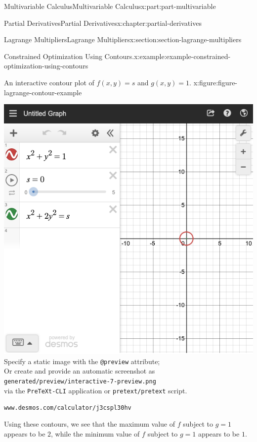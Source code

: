 \documentclass[twoside,10pt,]{book}
\newcommand{\mono}[1]{\texttt{#1}}
\numberwithin{equation}{part}
\newlength{\qrsize}
\newlength{\previewwidth}
\begin{document}
\begin{partptx}{Multivariable Calculus}{}{Multivariable Calculus}{}{}{x:part:part-multivariable}
\begin{chapterptx}{Partial Derivatives}{}{Partial Derivatives}{}{}{x:chapter:partial-derivatives}
\begin{sectionptx}{Lagrange Multipliers}{}{Lagrange Multipliers}{}{}{x:section:section-lagrange-multipliers}
\begin{example}{Constrained Optimization Using Contours.}{x:example:example-constrained-optimization-using-contours}
\begin{figureptx}{An interactive contour plot of \(f(x,y) = s\) and \(g(x,y) = 1\).%
}{x:figure:figure-lagrange-contour-example}{}
\begin{tcbraster}[raster columns=2, raster column skip=1pt, raster halign=center, raster force size=false, raster left skip=0pt, raster right skip=0pt]
\begin{tcolorbox}[previewstyle, width=\previewwidth]
{\includegraphics[width=0.80\linewidth,height=\qrsize,keepaspectratio]{generated/preview/interactive-7-preview.png}}%
{\small{}Specify a static image with the \mono{@preview} attribute;\\%
Or create and provide an automatic screenshot as\\%
\mono{generated/preview/interactive-7-preview.png}\\%
via the \mono{PreTeXt-CLI} application or \mono{pretext/pretext} script.}%
\end{tcolorbox}%
\begin{tcolorbox}[qrstyle]%
{\hypersetup{urlcolor=black}}%
\end{tcolorbox}%
\begin{tcolorbox}[captionstyle]%
\small \mono{www.desmos.com/calculator/j3cspl30hv}\end{tcolorbox}%
\end{tcbraster}%
\tcblower
\end{figureptx}%
Using these contours, we see that the maximum value of \(f\) subject to \(g = 1\) appears to be \(2\), while the minimum value of \(f\) subject to \(g=1\) appears to be \(1\).%
\end{example}

\end{sectionptx}
\end{chapterptx}
\end{partptx}
\end{document}
